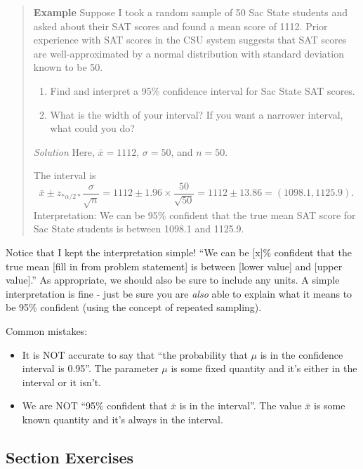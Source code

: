 \documentclass[
]{book}
\providecommand{\tightlist}{%
  \setlength{\itemsep}{0pt}\setlength{\parskip}{0pt}}
\begin{document}
\begin{quote}
\textbf{Example} Suppose I took a random sample of 50 Sac State students and asked about their SAT scores and found a mean score of 1112. Prior experience with SAT scores in the CSU system suggests that SAT scores are well-approximated by a normal distribution with standard deviation known to be 50.

\begin{enumerate}
\def\labelenumi{\arabic{enumi}.}
\tightlist
\item
  Find and interpret a 95\% confidence interval for Sac State SAT scores.
\item
  What is the width of your interval? If you want a narrower interval, what could you do?
\end{enumerate}

\emph{Solution} Here, \(\bar{x} = 1112\), \(\sigma=50\), and \(n=50\).

The interval is \[
\bar{x} \pm z_{*\alpha/2*}\frac{\sigma}{\sqrt{n}} = 1112 \pm 1.96\times\frac{50}{\sqrt{50}} = 1112 \pm 13.86 = (1098.1, 1125.9).
\]
Interpretation: We can be 95\% confident that the true mean SAT score for Sac State students is between 1098.1 and 1125.9.
\end{quote}

Notice that I kept the interpretation simple! ``We can be {[}x{]}\% confident that the true mean {[}fill in from problem statement{]} is between {[}lower value{]} and {[}upper value{]}.'' As appropriate, we should also be sure to include any units. A simple interpretation is fine - just be sure you are \emph{also} able to explain what it means to be 95\% confident (using the concept of repeated sampling).

Common mistakes:

\begin{itemize}
\tightlist
\item
  It is NOT accurate to say that ``the probability that \(\mu\) is in the confidence interval is 0.95''. The parameter \(\mu\) is some fixed quantity and it's either in the interval or it isn't.
\item
  We are NOT ``95\% confident that \(\bar{x}\) is in the interval''. The value \(\bar{x}\) is some known quantity and it's always in the interval.
\end{itemize}

\subsection*{Section Exercises}\label{section-exercises-17}
\end{document}
